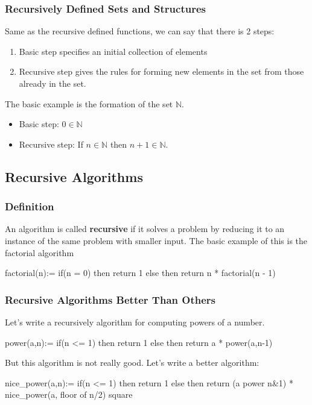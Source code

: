 \documentclass{article}
\begin{document}
\subsubsection{Recursively Defined Sets and Structures} Same as the recursive defined functions, we can say that there is 2 steps:
\begin{enumerate}
\item Basic step specifies an initial collection of elements
\item Recursive step gives the rules for forming new elements in the set from those already in the set.
\end{enumerate}
The basic example is the formation of the set $ \mathbb{N} $.
\begin{itemize}
\item Basic step: $ 0 \in \mathbb{N} $
\item Recursive step: If $ n \in \mathbb{N} $ then $ n + 1 \in \mathbb{N} $.
\end{itemize}

\subsection{Recursive Algorithms}
\subsubsection{Definition} An algorithm is called \textbf{recursive} if it solves a problem by reducing it to an instance of the same problem with smaller input. The basic example of this is the factorial algorithm
\begin{mylisting}
	factorial(n):=
		if(n = 0)
			then return 1
		else
			then return n * factorial(n - 1)				
\end{mylisting}

\subsubsection{Recursive Algorithms Better Than Others} Let's write a recursively algorithm for computing powers of a number.
\begin{mylisting}
	power(a,n):=
		if(n <= 1)
			then return 1
		else
			then return a * power(a,n-1)				
\end{mylisting}
But this algorithm is not really good. Let's write a better algorithm:
\begin{mylisting}
	nice_power(a,n):=
		if(n <= 1)
			then return 1
		else
			then return (a power n&1) *
			nice_power(a, floor of n/2) square				
\end{mylisting}
\end{document}

